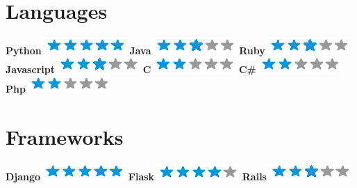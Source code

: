 \begin{aside}
    ~
    ~
    ~
    ~
    ~
    ~
    ~
    ~
    ~
    ~
    ~
    ~
    ~
    ~
    \section{Languages}
    \textbf{Python}\includegraphics[scale=0.40]{img/5stars.png}
    \textbf{Java}\includegraphics[scale=0.40]{img/3stars.png}
    \textbf{Ruby}\includegraphics[scale=0.40]{img/3stars.png}
    \textbf{Javascript}\includegraphics[scale=0.40]{img/3stars.png}
    \textbf{C}\includegraphics[scale=0.40]{img/2stars.png}
    \textbf{C\#}\includegraphics[scale=0.40]{img/2stars.png}
    \textbf{Php}\includegraphics[scale=0.40]{img/2stars.png}
    ~
    ~
    ~
    ~
    ~
    ~
    ~
    \section{Frameworks}
    \textbf{Django}\includegraphics[scale=0.40]{img/5stars.png}
    \textbf{Flask}\includegraphics[scale=0.40]{img/4stars.png}
    \textbf{Rails}\includegraphics[scale=0.40]{img/3stars.png}
    ~
    ~
    ~
    ~
    ~
    ~
    ~
\end{aside}
